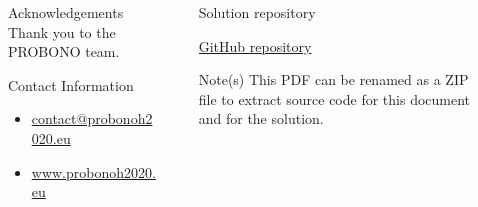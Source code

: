 \documentclass[final]{beamer}
\newlength{\sepmargin}
\newlength{\sepwid}
\newlength{\onecolwid}
\begin{document}
      \begin{columns}[t] %
      
      \begin{column}{\sepmargin} \end{column}
        \begin{column}{\onecolwid} %
			\begin{block}{\large Acknowledgements}
                    Thank you to the PROBONO team.
				\end{block}	
                \vspace*{-0.9cm}
				\begin{alertblock}{\large Contact Information}
                \vspace*{-0.5cm}
					\begin{footnotesize}
					\begin{itemize}
						\item \href{mailto:luc.jonveaux@mottmac.com}{contact@probonoh2020.eu}
						\item \href{https://www.probonoh2020.eu/}{www.probonoh2020.eu}
					\end{itemize}
					\end{footnotesize}	
					
				\end{alertblock}
		    \end{column} %
			\begin{column}{\sepwid}\end{column} %
			\begin{column}{\onecolwid} %
              \begin{block}{\large Solution repository}
              	\nocite{*} %
					
						\href{https://github.com/mm80843/T3.5}{GitHub repository}
      
				\end{block} 
    \begin{block}{\large Note(s)}
              	\nocite{*} %
						This PDF can be renamed as a ZIP file to extract source code for this document and for the solution.
				\end{block} 
			\end{column} %
            

\end{columns}
\end{document}
